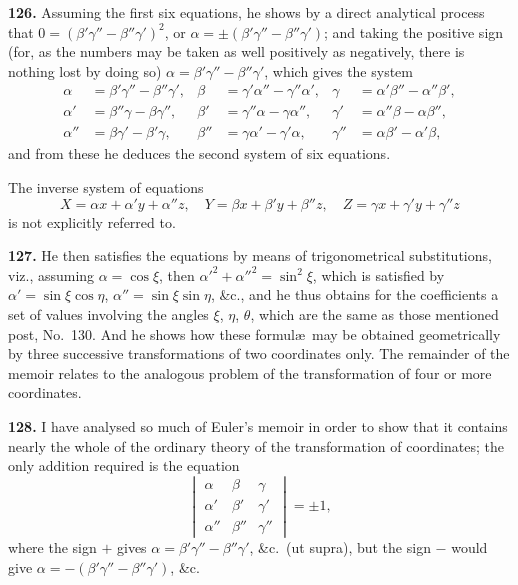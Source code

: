 \documentclass[11pt,a4paper]{article}
\theoremstyle{definition}
\begin{document}
\textbf{126.} Assuming the first six equations, he shows by a direct analytical process that $0 = (\beta'\gamma'' - \beta''\gamma')^2$, or $\alpha = \pm(\beta'\gamma'' - \beta''\gamma')$; and taking the positive sign (for, as the numbers may be taken as well positively as negatively, there is nothing lost by doing so) $\alpha = \beta'\gamma'' - \beta''\gamma'$, which gives the system
\begin{align*}
\alpha &= \beta'\gamma'' - \beta''\gamma', & \beta &= \gamma'\alpha'' - \gamma''\alpha', & \gamma &= \alpha'\beta'' - \alpha''\beta', \\
\alpha' &= \beta''\gamma - \beta\gamma'', & \beta' &= \gamma''\alpha - \gamma\alpha'', & \gamma' &= \alpha''\beta - \alpha\beta'', \\
\alpha'' &= \beta\gamma' - \beta'\gamma, & \beta'' &= \gamma\alpha' - \gamma'\alpha, & \gamma'' &= \alpha\beta' - \alpha'\beta,
\end{align*}
and from these he deduces the second system of six equations.

The inverse system of equations
\[
X = \alpha x + \alpha' y + \alpha'' z, \quad Y = \beta x + \beta' y + \beta'' z, \quad Z = \gamma x + \gamma' y + \gamma'' z
\]
is not explicitly referred to.

\textbf{127.} He then satisfies the equations by means of trigonometrical substitutions, viz., assuming $\alpha = \cos\xi$, then $\alpha'^2 + \alpha''^2 = \sin^2\xi$, which is satisfied by $\alpha' = \sin\xi\cos\eta$, $\alpha'' = \sin\xi\sin\eta$, \&c., and he thus obtains for the coefficients a set of values involving the angles $\xi$, $\eta$, $\theta$, which are the same as those mentioned post, No.~130. And he shows how these formul\ae\ may be obtained geometrically by three successive transformations of two coordinates only. The remainder of the memoir relates to the analogous problem of the transformation of four or more coordinates.

\textbf{128.} I have analysed so much of Euler's memoir in order to show that it contains nearly the whole of the ordinary theory of the transformation of coordinates; the only addition required is the equation
\[
\begin{vmatrix}
\alpha & \beta & \gamma \\
\alpha' & \beta' & \gamma' \\
\alpha'' & \beta'' & \gamma''
\end{vmatrix} = \pm 1,
\]
where the sign $+$ gives $\alpha = \beta'\gamma'' - \beta''\gamma'$, \&c.\ (ut supra), but the sign $-$ would give $\alpha = -(\beta'\gamma'' - \beta''\gamma')$, \&c.
\end{document}
